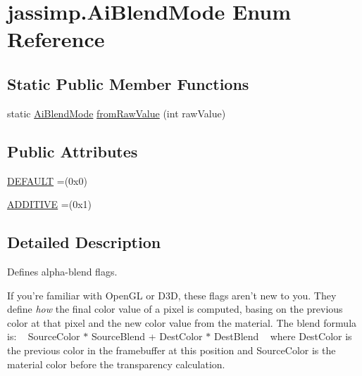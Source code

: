 \hypertarget{enumjassimp_1_1_ai_blend_mode}{\section{jassimp.\+Ai\+Blend\+Mode Enum Reference}
\label{enumjassimp_1_1_ai_blend_mode}
}
\subsection*{Static Public Member Functions}
\begin{DoxyCompactItemize}
\item 
static \hyperlink{enumjassimp_1_1_ai_blend_mode}{Ai\+Blend\+Mode} \hyperlink{enumjassimp_1_1_ai_blend_mode_ac879b40417b787f111ac558b8cd6f9a0}{from\+Raw\+Value} (int raw\+Value)
\end{DoxyCompactItemize}
\subsection*{Public Attributes}
\begin{DoxyCompactItemize}
\item 
\hyperlink{enumjassimp_1_1_ai_blend_mode_a86f3ba70030a6263ccdc6f4d558908c0}{D\+E\+F\+A\+U\+L\+T} =(0x0)
\item 
\hyperlink{enumjassimp_1_1_ai_blend_mode_a3f743f98809def27847bcd6aa40c986a}{A\+D\+D\+I\+T\+I\+V\+E} =(0x1)
\end{DoxyCompactItemize}


\subsection{Detailed Description}
Defines alpha-\/blend flags.

If you're familiar with Open\+G\+L or D3\+D, these flags aren't new to you. They define {\itshape how} the final color value of a pixel is computed, basing on the previous color at that pixel and the new color value from the material. The blend formula is\+: ~\newline
{\ttfamily  Source\+Color $\ast$ Source\+Blend + Dest\+Color $\ast$ Dest\+Blend }~\newline
 where {\ttfamily Dest\+Color} is the previous color in the framebuffer at this position and {\ttfamily Source\+Color} is the material color before the transparency calculation. 


